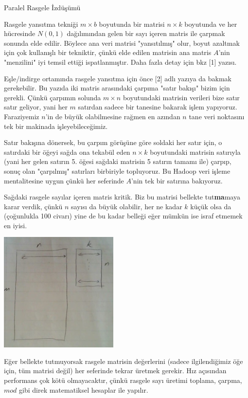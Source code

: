 \documentclass[12pt,fleqn]{article}\usepackage{../../common}
\begin{document}
Paralel Rasgele İzdüşümü

Rasgele yansıtma tekniği $m \times b$ boyutunda bir matrisi $n \times k$
boyutunda ve her hücresinde $N(0,1)$ dağılımından gelen bir sayı içeren
matris ile çarpmak sonunda elde edilir. Böylece ana veri matrisi
"yansıtılmış" olur, boyut azaltmak için çok kullanışlı bir tekniktir, çünkü
elde edilen matrisin ana matris $A$'nin "menzilini" iyi temsil ettiği
ispatlanmıştır. Daha fazla detay için bkz [1] yazısı.

Eşle/indirge ortamında rasgele yansıtma için önce [2] adlı yazıya da bakmak
gerekebilir. Bu yazıda iki matris arasındaki çarpıma "satır bakışı" bizim
için gerekli. Çünkü çarpımın solunda $m \times n$ boyutundaki matrisin
verileri bize satır satır geliyor, yani her $m$ satırdan sadece bir
tanesine bakarak işlem yapıyoruz. Faraziyemiz $n$'in de büyük olabilmesine
rağmen en azından $n$ tane veri noktasını tek bir makinada
işleyebileceğimiz.

Satır bakışına dönersek, bu çarpım görüşüne göre soldaki her satır
için, o satırdaki bir öğeyi sağda ona tekabül eden $n \times k$
boyutundaki matrisin satırıyla (yani her gelen satırın 5. öğesi
sağdaki matrisin 5 satırın tamamı ile) çarpıp, sonuç olan "çarpılmış"
satırları birbiriyle topluyoruz. Bu Hadoop veri işleme mentalitesine
uygun çünkü her seferinde $A$'nin tek bir satırına bakıyoruz.

Sağdaki rasgele sayılar içeren matris kritik. Biz bu matrisi bellekte
tut\textbf{ma}maya karar verdik, çünkü $n$ sayısı da büyük olabilir, her
ne kadar $k$ küçük olsa da (çoğunlukla 100 civarı) yine de bu kadar
belleği eğer mümkün ise israf etmemek en iyisi.

\includegraphics[height=6cm]{proj.png}

Eğer bellekte tutmuyorsak rasgele matrisin değerlerini (sadece
ilgilendiğimiz öğe için, tüm matrisi değil) her seferinde tekrar
üretmek gerekir. Hız açısından performans çok kötü olmayacaktır, çünkü
rasgele sayı üretimi toplama, çarpma, $mod$ gibi direk matematiksel
hesaplar ile yapılır.
\end{document}
